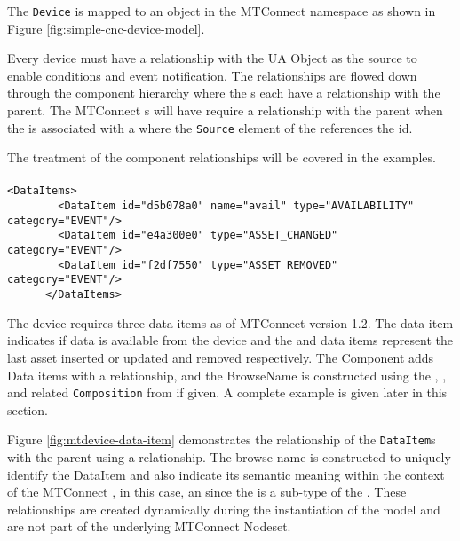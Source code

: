 The \texttt{Device} is mapped to an  object in the MTConnect namespace as shown in Figure \ref{fig:simple-cnc-device-model}.



Every device must have a  relationship with the  UA Object as the source to enable conditions and event notification. The  relationships are flowed down through the component hierarchy where the s each have a  relationship with the parent. The MTConnect s will have require a  relationship with the parent  when the  is associated with a  where the \texttt{Source} element of the  references the  id. 

The treatment of the component relationships will be covered in the  examples.

\paragraph{ }

\begin{lstlisting}[firstnumber=last,%
    caption={Device Data Items},label={lst:device-data-items}]
      <DataItems>
        <DataItem id="d5b078a0" name="avail" type="AVAILABILITY" category="EVENT"/>
        <DataItem id="e4a300e0" type="ASSET_CHANGED" category="EVENT"/>
        <DataItem id="f2df7550" type="ASSET_REMOVED" category="EVENT"/>
      </DataItems>
\end{lstlisting}

The device requires three data items as of MTConnect version 1.2. The  data item indicates if data is available from the device and the  and  data items represent the last asset inserted or updated and removed respectively. The Component adds Data items with a  relationship, and the BrowseName is constructed using the , , and related \texttt{Composition} from  if given. A complete example is given later in this section.



Figure \ref{fig:mtdevice-data-item} demonstrates the relationship of the \texttt{Data\-Item}s with the parent  using a  relationship. The browse name is constructed to uniquely identify the DataItem and also indicate its semantic meaning within the context of the MTConnect , in this case, an  since the  is a sub-type of the . These relationships are created dynamically during the instantiation of the model and are not part of the underlying MTConnect Nodeset.

